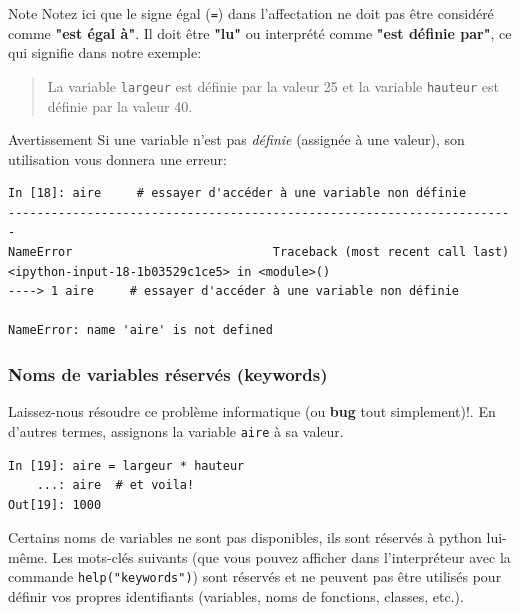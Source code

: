 \documentclass{beamer}
\begin{document}
\begin{frame}

\begin{block}{Note}
Notez ici que le signe égal (\texttt{=}) dans l'affectation ne doit pas être considéré comme \textbf{"est égal à"}. Il doit être \textbf{"lu"} ou interprété comme \textbf{"est définie par"}, ce qui signifie dans notre exemple:

\begin{quote}
La variable \texttt{largeur} est définie par la valeur 25 et la variable \texttt{hauteur} est définie par la valeur 40.
\end{quote}

\end{block}

\begin{block}{Avertissement}
Si une variable n'est pas \emph{définie} (assignée à une valeur), son utilisation vous donnera une erreur:

\begin{verbatim}
In [18]: aire     # essayer d'accéder à une variable non définie
-----------------------------------------------------------------------
NameError                            Traceback (most recent call last)
<ipython-input-18-1b03529c1ce5> in <module>()
----> 1 aire     # essayer d'accéder à une variable non définie

NameError: name 'aire' is not defined
\end{verbatim}
\end{block}
\end{frame}

\begin{frame}
\frametitle{Noms de variables réservés (keywords)}

Laissez-nous résoudre ce problème informatique (ou \textbf{bug} tout simplement)!. En d'autres termes, assignons la variable \texttt{aire} à sa valeur.

\begin{verbatim}
In [19]: aire = largeur * hauteur
    ...: aire  # et voila!
Out[19]: 1000
\end{verbatim}


Certains noms de variables ne sont pas disponibles, ils sont réservés à python lui-même. Les mots-clés suivants (que vous pouvez afficher dans l'interpréteur avec la commande \texttt{help("keywords")}) sont réservés et ne peuvent pas être utilisés pour définir vos propres identifiants (variables, noms de fonctions, classes, etc.).
\end{frame}
\end{document}
